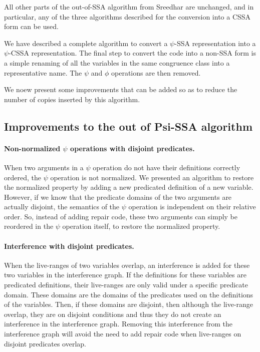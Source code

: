 All other parts of the out-of-SSA algorithm from Sreedhar are
unchanged, and in particular, any of the three algorithms described
for the conversion into a CSSA form can be used.

We have described a complete algorithm to convert a $\psi$-SSA
representation into a $\psi$-CSSA representation. The final step to
convert the code into a non-SSA form is a simple renaming of all the
variables in the same congruence class into a representative name. The
$\psi$ and $\phi$ operations are then removed.

We noew present some improvements that can be added so as to reduce
the number of copies inserted by this algorithm.

\subsection{Improvements to the out of Psi-SSA algorithm}

\paragraph{Non-normalized $\psi$ operations with disjoint predicates.}
When two arguments in a $\psi$ operation do not have their definitions
correctly ordered, the $\psi$ operation is not normalized. We
presented an algorithm to restore the normalized property by adding a
new predicated definition of a new variable. However, if we know that
the predicate domains of the two arguments are actually disjoint, the
semantics of the $\psi$ operation is independent on their relative
order. So, instead of adding repair code, these two arguments can
simply be reordered in the $\psi$ operation itself, to restore the
normalized property.

\paragraph{Interference with disjoint predicates.}
When the live-ranges of two variables overlap, an interference is
added for these two variables in the interference graph. If the
definitions for these variables are predicated definitions, their
live-ranges are only valid under a specific predicate domain. These
domains are the domains of the predicates used on the definitions of
the variables. Then, if these domains are disjoint, then although the
live-range overlap, they are on disjoint conditions and thus they do
not create an interference in the interference graph. Removing this
interference from the interference graph will avoid the need to add repair code
when live-ranges on disjoint predicates overlap.

